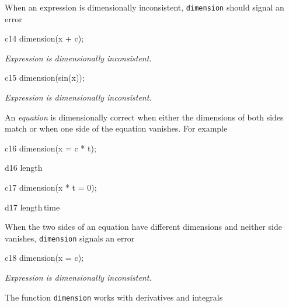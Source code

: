 \documentclass[12pt]{article}
\begin{document}
\noindent When an expression is dimensionally inconsistent,
{\tt dimension} should signal an error



\begin{mcline}{c14}
dimension(x + c);
\end{mcline}

{\em Expression is dimensionally inconsistent.}


\begin{mcline}{c15}
dimension(sin(x));
\end{mcline}

{\em Expression is dimensionally inconsistent.}

\vspace{0.1in}

\noindent An {\em equation\/} is dimensionally correct
when either the dimensions of both sides match or
when one side of the equation vanishes.  For example

\begin{mcline}{c16}
dimension(x = c * t);
\end{mcline}

\begin{mdline}{d16}
length
\end{mdline}

\begin{mcline}{c17}
dimension(x * t = 0);
\end{mcline}

\begin{mdline}{d17}
length\,time
\end{mdline}


\vspace{0.1in}

\noindent When the two sides of an equation have
different dimensions and neither side vanishes,
{\tt dimension} signals an error

\vspace{0.1in}



\begin{mcline}{c18}
dimension(x = c);
\end{mcline}

{\em Expression is dimensionally inconsistent.}

\vspace{0.1in}

\noindent The function {\tt dimension} works with derivatives and
integrals

\vspace{0.1in}
\end{document}
